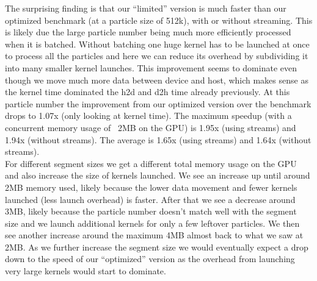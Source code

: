 The surprising finding is that our “limited” version is much faster than our optimized benchmark (at a particle size of 512k), with or without streaming. This is likely due the large particle number being much more efficiently processed when it is batched. Without batching one huge kernel has to be launched at once to process all the particles and here we can reduce its overhead by subdividing it into many smaller kernel launches. This improvement seems to dominate even though we move much more data between device and host, which makes sense as  the kernel time dominated the h2d and d2h time already previously. At this particle number the improvement from our optimized version over the benchmark drops to 1.07x (only looking at kernel time). The maximum speedup (with a concurrent memory usage of ~2MB on the GPU) is  1.95x (using streams) and 1.94x (without streams). The average is 1.65x (using streams) and 1.64x (without streams). \\

For different segment sizes we get a different total memory usage on the GPU and also increase the size of kernels launched. We see an increase up until around 2MB memory used, likely because the lower data movement and fewer kernels launched (less launch overhead) is faster. After that we see a decrease around 3MB, likely because the particle number doesn’t match well with the segment size and we launch additional kernels for only a few leftover particles. We then see another increase around the maximum 4MB almost back to what we saw at 2MB. As we further increase the segment size we would eventually expect a drop down to the speed of our “optimized” version as the overhead from launching very large kernels would start to dominate.
